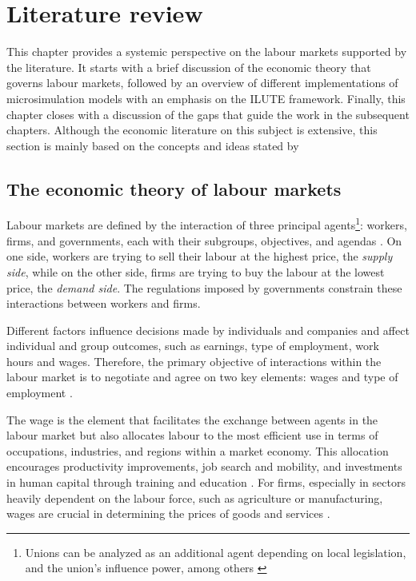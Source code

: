 \chapter{Literature review}

This chapter provides a systemic perspective on the labour 
markets supported by the literature. It starts with a brief 
discussion of the economic theory that governs labour markets, 
followed by an overview of different implementations of 
microsimulation models with an emphasis on the ILUTE framework. 
Finally, this chapter closes with a discussion of the gaps 
that guide the work in the subsequent chapters. Although the 
economic literature on this subject is extensive, this section 
is mainly based on the concepts and ideas stated by
\citep{Benjamin2021,Borjas2020,Kaufman2003,Smith2003}

\section{The economic theory of labour markets}

Labour markets are defined by the interaction of three principal agents\footnote{Unions can be analyzed as an additional agent depending on local legislation, and the union's influence power, among others \citep{Borjas2020}}: workers, firms, and governments, each with their subgroups, objectives, and agendas \citep{Benjamin2021}. On one side, workers are trying to sell their labour at the highest price, the \textit{supply side}, while on the other side, firms are trying to buy the labour at the lowest price, the \textit{demand side}. The regulations imposed by governments constrain these interactions between workers and firms. 

Different factors influence decisions made by individuals and companies and affect individual and group outcomes, such as earnings, type of employment, work hours and wages. Therefore, the primary objective of interactions within the labour market is to negotiate and agree on two key elements: wages and type of employment \citep{Benjamin2021}. 

The wage is the element that facilitates the exchange between agents in the labour market but also allocates labour to the most efficient use in terms of occupations, industries, and regions within a market economy. This allocation encourages productivity improvements, job search and mobility, and investments in human capital through training and education \citep{Benjamin2021}. For firms, especially in sectors heavily dependent on the labour force, such as agriculture or manufacturing, wages are crucial in determining the prices of goods and services \citep{Borjas2020}.

